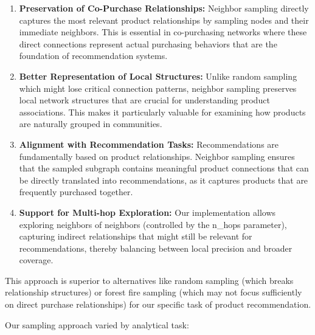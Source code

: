 \documentclass[conference]{IEEEtran}
\begin{document}
\begin{enumerate}
    \item \textbf{Preservation of Co-Purchase Relationships:} Neighbor sampling directly captures the most relevant product relationships by sampling nodes and their immediate neighbors. This is essential in co-purchasing networks where these direct connections represent actual purchasing behaviors that are the foundation of recommendation systems.
    
    \item \textbf{Better Representation of Local Structures:} Unlike random sampling which might lose critical connection patterns, neighbor sampling preserves local network structures that are crucial for understanding product associations. This makes it particularly valuable for examining how products are naturally grouped in communities.
    
    \item \textbf{Alignment with Recommendation Tasks:} Recommendations are fundamentally based on product relationships. Neighbor sampling ensures that the sampled subgraph contains meaningful product connections that can be directly translated into recommendations, as it captures products that are frequently purchased together.
    
    \item \textbf{Support for Multi-hop Exploration:} Our implementation allows exploring neighbors of neighbors (controlled by the n\_hops parameter), capturing indirect relationships that might still be relevant for recommendations, thereby balancing between local precision and broader coverage.
\end{enumerate}

This approach is superior to alternatives like random sampling (which breaks relationship structures) or forest fire sampling (which may not focus sufficiently on direct purchase relationships) for our specific task of product recommendation.

Our sampling approach varied by analytical task:
\end{document}
